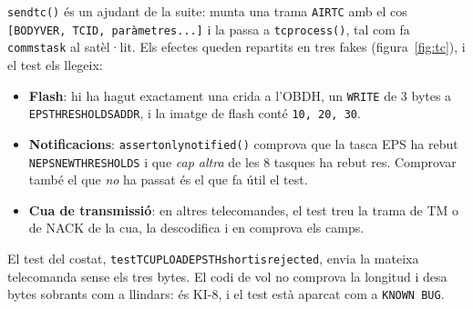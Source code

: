 \documentclass[11pt,a4paper]{article}
\DeclareRobustCommand{\_}{\textunderscore\allowbreak}
\newcommand{\cd}[1]{\texttt{#1}}
\begin{document}
\cd{send\_tc()} és un ajudant de la suite: munta una trama \cd{AIR\_TC} amb el cos
\cd{[BODY\_VER, TC\_ID, paràmetres...]} i la passa a \cd{tc\_process()}, tal com fa
\cd{comms\_task} al satèl·lit. Els efectes queden repartits en tres fakes
(figura~\ref{fig:tc}), i el test els llegeix:
\begin{itemize}
\item \textbf{Flash}: hi ha hagut exactament una crida a l'OBDH, un \cd{WRITE} de 3 bytes a
  \cd{EPS\_THRESHOLDS\_ADDR}, i la imatge de flash conté \cd{10, 20, 30}.
\item \textbf{Notificacions}: \cd{assert\_only\_notified()} comprova que la tasca EPS ha rebut
  \cd{N\_EPS\_NEW\_THRESHOLDS} i que \emph{cap altra} de les 8 tasques ha rebut res. Comprovar
  també el que \emph{no} ha passat és el que fa útil el test.
\item \textbf{Cua de transmissió}: en altres telecomandes, el test treu la trama de TM o
  de NACK de la cua, la descodifica i en comprova els camps.
\end{itemize}

El test del costat, \cd{test\_TC\_UPLOAD\_EPS\_TH\_short\_is\_rejected}, envia la mateixa
telecomanda sense els tres bytes. El codi de vol no comprova la longitud i desa bytes
sobrants com a llindars: és KI-8, i el test està aparcat com a \cd{KNOWN BUG}.
\end{document}
